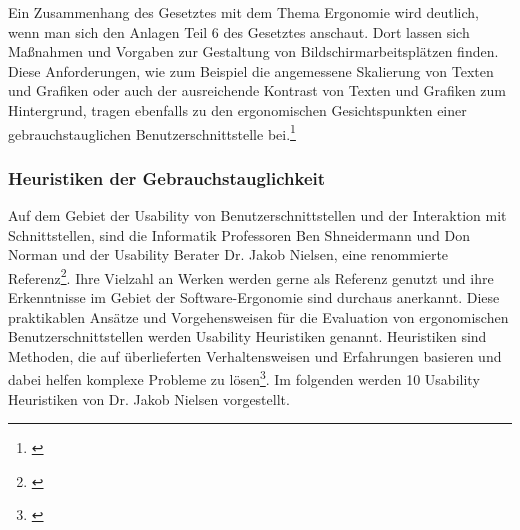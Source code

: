 Ein Zusammenhang des Gesetztes mit dem Thema Ergonomie wird deutlich, wenn man sich den Anlagen Teil 6 des Gesetztes anschaut. Dort lassen sich Maßnahmen und Vorgaben zur Gestaltung von Bildschirmarbeitsplätzen finden. Diese Anforderungen, wie zum Beispiel die angemessene Skalierung von Texten und Grafiken oder auch der ausreichende Kontrast von Texten und Grafiken zum Hintergrund, tragen ebenfalls zu den ergonomischen Gesichtspunkten einer gebrauchstauglichen Benutzerschnittstelle bei.\footnote{\cite[vgl.][Anhang: Kap. 6]{ArbStaettV}}


\subsubsection{Heuristiken der Gebrauchstauglichkeit}
\label{sec:heuristikenDerGebrauchstauglichkeit}
Auf dem Gebiet der Usability von Benutzerschnittstellen und der Interaktion mit Schnittstellen, sind die Informatik Professoren Ben Shneidermann und Don Norman und der Usability Berater Dr. Jakob Nielsen, eine renommierte Referenz\footnote{\cite[vgl.][]{Wong2018}}. Ihre Vielzahl an Werken werden gerne als Referenz genutzt und ihre Erkenntnisse im Gebiet der Software-Ergonomie sind durchaus anerkannt. Diese praktikablen Ansätze und Vorgehensweisen für die Evaluation von ergonomischen Benutzerschnittstellen werden Usability Heuristiken genannt. Heuristiken sind Methoden, die auf überlieferten Verhaltensweisen und Erfahrungen basieren und dabei helfen komplexe Probleme zu lösen\footnote{\cite[vgl.][]{Heuristik2018}}. Im folgenden werden 10 Usability Heuristiken von Dr. Jakob Nielsen vorgestellt.

